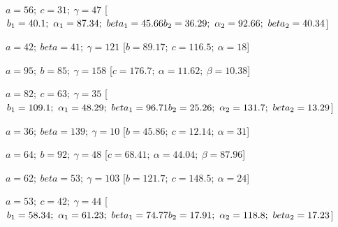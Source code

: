 \begin{esercizio}
\begin{enumeratea}
  \item  \(a=56;~c=31;~\gamma=47\)
   \hfill [\(b_1=40.1;~\alpha_1=87.34;~beta_1=45.66 \\
   {} \hfill          b_2=36.29;~\alpha_2=92.66;~beta_2=40.34\)]
  \item  \(a=42;~beta=41;~\gamma=121\)
   \hfill [\(b=89.17;~c=116.5;~\alpha=18\)]
  \item  \(a=95;~b=85;~\gamma=158\)
   \hfill [\(c=176.7;~\alpha=11.62;~\beta=10.38\)]
  \item  \(a=82;~c=63;~\gamma=35\)
   \hfill [\(b_1=109.1;~\alpha_1=48.29;~beta_1=96.71 \\
   {} \hfill          b_2=25.26;~\alpha_2=131.7;~beta_2=13.29\)]
  \item  \(a=36;~beta=139;~\gamma=10\)
   \hfill [\(b=45.86;~c=12.14;~\alpha=31\)]
  \item  \(a=64;~b=92;~\gamma=48\)
   \hfill [\(c=68.41;~\alpha=44.04;~\beta=87.96\)]
  \item  \(a=62;~beta=53;~\gamma=103\)
   \hfill [\(b=121.7;~c=148.5;~\alpha=24\)]
  \item  \(a=53;~c=42;~\gamma=44\)
   \hfill [\(b_1=58.34;~\alpha_1=61.23;~beta_1=74.77 \\
   {} \hfill          b_2=17.91;~\alpha_2=118.8;~beta_2=17.23\)]
 \end{enumeratea}
\end{esercizio}

